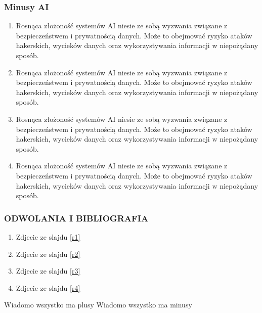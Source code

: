 \documentclass[9pt]{beamer}
\begin{document}
\begin{frame}
\frametitle{Minusy AI\cite{Minusy}}
\begin{enumerate}[1]
\item Rosnąca złożoność systemów AI niesie ze sobą wyzwania związane z bezpieczeństwem i prywatnością danych. Może to obejmować ryzyko ataków hakerskich, wycieków danych oraz wykorzystywania informacji w niepożądany sposób.
\item  Rosnąca złożoność systemów AI niesie ze sobą wyzwania związane z bezpieczeństwem i prywatnością danych. Może to obejmować ryzyko ataków hakerskich, wycieków danych oraz wykorzystywania informacji w niepożądany sposób.
\item Rosnąca złożoność systemów AI niesie ze sobą wyzwania związane z bezpieczeństwem i prywatnością danych. Może to obejmować ryzyko ataków hakerskich, wycieków danych oraz wykorzystywania informacji w niepożądany sposób.
\item Rosnąca złożoność systemów AI niesie ze sobą wyzwania związane z bezpieczeństwem i prywatnością danych. Może to obejmować ryzyko ataków hakerskich, wycieków danych oraz wykorzystywania informacji w niepożądany sposób.
\end{enumerate}
\end{frame}

\begin{frame}
\frametitle{ODWOLANIA I BIBLIOGRAFIA}
\begin{enumerate}[a]
\item Zdjecie ze slajdu \ref{r1}
\item Zdjecie ze slajdu \ref{r2}
\item Zdjecie ze slajdu \ref{r3}
\item Zdjecie ze slajdu \ref{r4}
\end{enumerate}
\begin{thebibliography}{99}
Wiadomo wszystko ma plusy
Wiadomo wszystko ma minusy
\end{thebibliography}
\end{frame}
\end{document}
